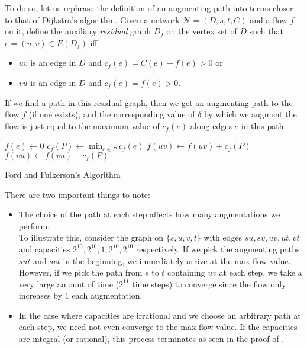 			To do so, let us rephrase the definition of an augmenting path into terms closer to that of Dijkstra's algorithm.
			Given a network $\mathcal{N}=(D,s,t,C)$ and a flow $f$ on it, define the auxiliary \emph{residual} graph $D_f$ on the vertex set of $D$ such that $e = (u,v)\in E(D_f)$ iff
			\begin{itemize}
				\item $uv$ is an edge in $D$ and $c_f(e) = C(e) - f(e) > 0$ or
				\item $vu$ is an edge in $D$ and $c_f(e) = f(e) > 0$.
			\end{itemize}
			If we find a path in this residual graph, then we get an augmenting path to the flow $f$ (if one exists), and the corresponding value of $\delta$ by which we augment the flow is just equal to the maximum value of $c_f(e)$ along edges $e$ in this path.

			\begin{algorithm}[H]
				\DontPrintSemicolon
				\SetNoFillComment
				 {
					$f(e)\gets 0$
				}
				 {
					$c_f(P)\gets\min_{e \in P} c_f(e)$\;
					 {
						 {
							$f(uv)\gets f(uv) + c_f(P)$
						} {
							$f(vu) \gets f(vu) - c_f(P)$
						}
					}
				}
				\;
				\caption{Ford and Fulkerson's Algorithm}\label{algo: FF max flow}
			\end{algorithm}

			There are two important things to note:
			\begin{itemize}
				\item The choice of the path at each step affects how many augmentations we perform.\\
				To illustrate this, consider the graph on $\{s,u,v,t\}$ with edges $su,sv,uv,ut,vt$ and capacities $2^{10},2^{10},1,2^{10},2^{10}$ respectively. If we pick the augmenting paths $sut$ and $svt$ in the beginning, we immediately arrive at the max-flow value. However, if we pick the path from $s$ to $t$ containing $uv$ at each step, we take a very large amount of time ($2^{11}$ time steps) to converge since the flow only increases by $1$ each augmentation.

				\item In the case where capacities are irrational and we choose an arbitrary path at each step, we need not even converge to the max-flow value. If the capacities are integral (or rational), this process terminates as seen in the proof of .
			\end{itemize}

